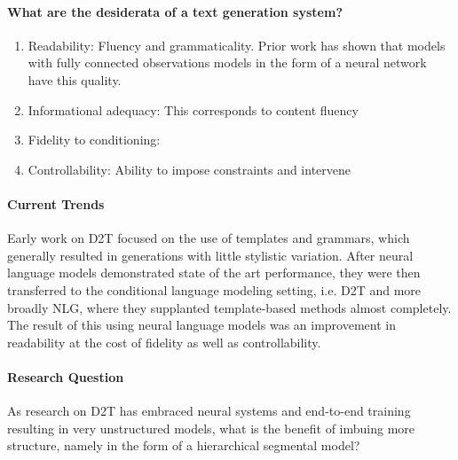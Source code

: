 \documentclass[11pt]{article}
\begin{document}
\paragraph{What are the desiderata of a text generation system?}
\begin{enumerate}
\item Readability: Fluency and grammaticality.
Prior work has shown that models with fully connected observations models
in the form of a neural network have this quality.
\item Informational adequacy: This corresponds to content fluency
\item Fidelity to conditioning: 
\item Controllability: Ability to impose constraints and intervene
\end{enumerate}

\paragraph{Current Trends}
Early work on D2T focused on the use of templates and grammars, 
which generally resulted in generations with little stylistic variation.
After neural language models demonstrated state of the art performance,
they were then transferred to the conditional language modeling setting,
i.e. D2T and more broadly NLG,
where they supplanted template-based methods almost completely.
The result of this using neural language models was an improvement in readability
at the cost of fidelity as well as controllability.

\paragraph{Research Question}
As research on D2T has embraced neural systems and end-to-end training resulting
in very unstructured models, what is the benefit of imbuing more structure, namely in the
form of a hierarchical segmental model?
\end{document}
